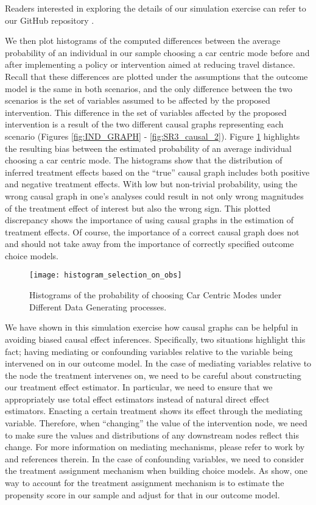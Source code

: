 Readers interested in exploring the details of our simulation exercise can refer to our GitHub repository \citep{brathwaite_etal_2020}.


We then plot histograms of the computed differences between the average probability of an individual
in our sample choosing a car centric mode before and after implementing a policy or intervention
aimed at reducing travel distance.
Recall that these differences are plotted under the assumptions that the outcome model is the same in both scenarios, and the only difference between the two scenarios is the set of variables assumed to be affected by the proposed intervention.
This difference in the set of variables affected by the proposed intervention is a result of the two different causal graphs representing each scenario (Figures \ref{fig:IND_GRAPH} - \ref{fig:SR3_causal_2}).
Figure \ref{fig:histogram_probability} highlights the resulting bias between the estimated probability of an average individual choosing a car centric mode.
The histograms show that the distribution of inferred treatment effects based on the ``true'' causal graph includes both positive and negative treatment effects.
With low but non-trivial probability, using the wrong causal graph in one's analyses could result in not only wrong magnitudes of the treatment effect of interest but also the wrong sign.
This plotted discrepancy shows the importance of using causal graphs in the estimation of treatment effects.
Of course, the importance of a correct causal graph does not and should not take away from the importance of correctly specified outcome choice models.

\begin{figure}[h!]
   \centering
   \texttt{[image: histogram\_selection\_on\_obs]}
   \caption{Histograms of the probability of choosing Car Centric Modes under Different Data Generating processes.}
   \label{fig:histogram_probability}
\end{figure}

We have shown in this simulation exercise how causal graphs can be helpful in avoiding biased causal effect inferences.
Specifically, two situations highlight this fact; having mediating or confounding variables relative to the variable being intervened on in our outcome model.
In the case of mediating variables relative to the node the treatment intervenes on, we need to be careful about constructing our treatment effect estimator.
In particular, we need to ensure that we appropriately use total effect estimators instead of natural direct effect estimators.
Enacting a certain treatment shows its effect through the mediating variable.
Therefore, when ``changing'' the value of the intervention node, we need to make sure the values and distributions of any downstream nodes reflect this change.
For more information on mediating mechanisms, please refer to work by \citet{pearl_2012_mediation} and references therein.
In the case of confounding variables, we need to consider the treatment assignment mechanism when building choice models.
As \citep{hahn_2020_bayesian} show, one way to account for the treatment assignment mechanism is to estimate the propensity score in our sample and adjust for that in our outcome model.


